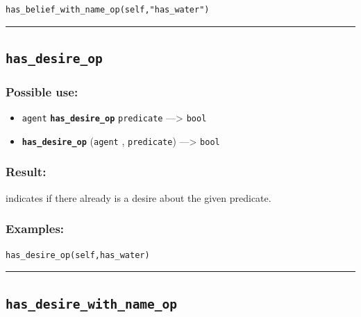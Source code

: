 \documentclass[]{book}
\providecommand{\tightlist}{%
  \setlength{\itemsep}{0pt}\setlength{\parskip}{0pt}}
\theoremstyle{definition}
\theoremstyle{definition}
\theoremstyle{definition}
\theoremstyle{remark}
\begin{document}
\begin{verbatim}
has_belief_with_name_op(self,"has_water") 
\end{verbatim}

\begin{center}\rule{0.5\linewidth}{\linethickness}\end{center}

\subsection{\texorpdfstring{\texttt{has\_desire\_op}}{has\_desire\_op}}\label{has_desire_op}

\subsubsection{Possible use:}\label{possible-use-248}

\begin{itemize}
\tightlist
\item
  \texttt{agent} \textbf{\texttt{has\_desire\_op}} \texttt{predicate}
  ---\textgreater{} \texttt{bool}
\item
  \textbf{\texttt{has\_desire\_op}} (\texttt{agent} ,
  \texttt{predicate}) ---\textgreater{} \texttt{bool}
\end{itemize}

\subsubsection{Result:}\label{result-239}

indicates if there already is a desire about the given predicate.

\subsubsection{Examples:}\label{examples-188}

\begin{verbatim}
has_desire_op(self,has_water) 
\end{verbatim}

\begin{center}\rule{0.5\linewidth}{\linethickness}\end{center}

\subsection{\texorpdfstring{\texttt{has\_desire\_with\_name\_op}}{has\_desire\_with\_name\_op}}\label{has_desire_with_name_op}
\end{document}
